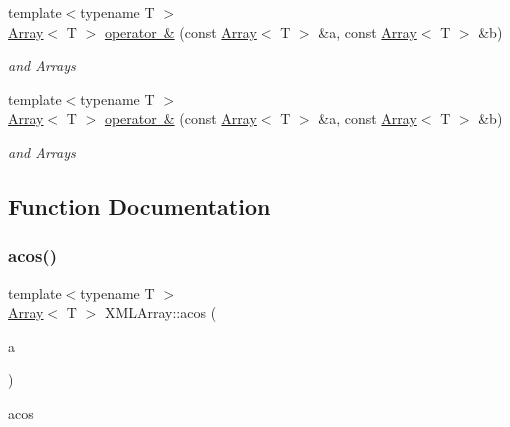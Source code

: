 \begin{DoxyCompactItemize}
{\footnotesize template$<$typename T $>$ }\\\mbox{\hyperlink{classXMLArray_1_1Array}{Array}}$<$ T $>$ \mbox{\hyperlink{namespaceXMLArray_a4e97a656e19bfbb4c5574c3a60b2ed93}{operator \&}} (const \mbox{\hyperlink{classXMLArray_1_1Array}{Array}}$<$ T $>$ \&a, const \mbox{\hyperlink{classXMLArray_1_1Array}{Array}}$<$ T $>$ \&b)
\begin{DoxyCompactList}\small\item\em and Arrays \end{DoxyCompactList}\item 
{\footnotesize template$<$typename T $>$ }\\\mbox{\hyperlink{classXMLArray_1_1Array}{Array}}$<$ T $>$ \mbox{\hyperlink{namespaceXMLArray_a4e97a656e19bfbb4c5574c3a60b2ed93}{operator \&}} (const \mbox{\hyperlink{classXMLArray_1_1Array}{Array}}$<$ T $>$ \&a, const \mbox{\hyperlink{classXMLArray_1_1Array}{Array}}$<$ T $>$ \&b)
\begin{DoxyCompactList}\small\item\em and Arrays \end{DoxyCompactList}\end{DoxyCompactItemize}


\subsection{Function Documentation}
\mbox{\label{namespaceXMLArray_a8fa6c5656b58ed00c7cff9fcdf6dbb96}} 
\subsubsection{\texorpdfstring{acos()}{acos()}}
{\footnotesize\ttfamily template$<$typename T $>$ \\
\mbox{\hyperlink{classXMLArray_1_1Array}{Array}}$<$ T $>$ X\+M\+L\+Array\+::acos (\begin{DoxyParamCaption}\item[{const \mbox{\hyperlink{classXMLArray_1_1Array}{Array}}$<$ T $>$ \&}]{a }\end{DoxyParamCaption})\hspace{0.3cm}{\ttfamily [inline]}}



acos 

\mbox{\label{namespaceXMLArray_ad218b241e0898d122bf3c722a16a1741}} 
